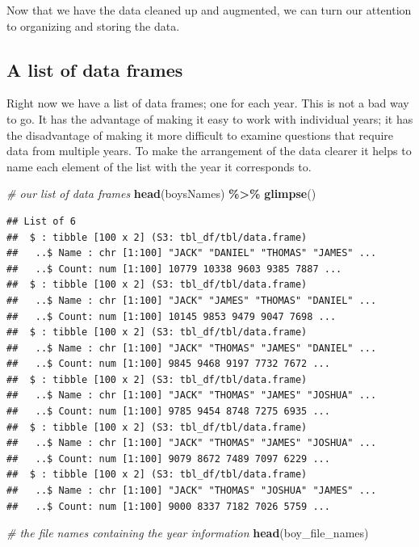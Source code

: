\documentclass[
]{book}
\newenvironment{Shaded}{\begin{snugshade}}{\end{snugshade}}
\newcommand{\CommentTok}[1]{\textcolor[rgb]{0.56,0.35,0.01}{\textit{#1}}}
\newcommand{\KeywordTok}[1]{\textcolor[rgb]{0.13,0.29,0.53}{\textbf{#1}}}
\newcommand{\NormalTok}[1]{#1}
\newcommand{\OperatorTok}[1]{\textcolor[rgb]{0.81,0.36,0.00}{\textbf{#1}}}
\newcommand{\StringTok}[1]{\textcolor[rgb]{0.31,0.60,0.02}{#1}}
\begin{document}
Now that we have the data cleaned up and augmented, we can turn our attention to organizing and storing the data.

\hypertarget{a-list-of-data-frames}{%
\subsection{A list of data frames}\label{a-list-of-data-frames}}

Right now we have a list of data frames; one for each year. This is not a bad way to go. It has the advantage of making it easy to work with individual years; it has the disadvantage of making it more difficult to examine questions that require data from multiple years. To make the arrangement of the data clearer it helps to name each element of the list with the year it corresponds to.

\begin{Shaded}
\begin{Highlighting}[]
\CommentTok{\# our list of data frames}
\KeywordTok{head}\NormalTok{(boysNames) }\OperatorTok{\%\textgreater{}\%}\StringTok{ }\KeywordTok{glimpse}\NormalTok{()}
\end{Highlighting}
\end{Shaded}

\begin{verbatim}
## List of 6
##  $ : tibble [100 x 2] (S3: tbl_df/tbl/data.frame)
##   ..$ Name : chr [1:100] "JACK" "DANIEL" "THOMAS" "JAMES" ...
##   ..$ Count: num [1:100] 10779 10338 9603 9385 7887 ...
##  $ : tibble [100 x 2] (S3: tbl_df/tbl/data.frame)
##   ..$ Name : chr [1:100] "JACK" "JAMES" "THOMAS" "DANIEL" ...
##   ..$ Count: num [1:100] 10145 9853 9479 9047 7698 ...
##  $ : tibble [100 x 2] (S3: tbl_df/tbl/data.frame)
##   ..$ Name : chr [1:100] "JACK" "THOMAS" "JAMES" "DANIEL" ...
##   ..$ Count: num [1:100] 9845 9468 9197 7732 7672 ...
##  $ : tibble [100 x 2] (S3: tbl_df/tbl/data.frame)
##   ..$ Name : chr [1:100] "JACK" "THOMAS" "JAMES" "JOSHUA" ...
##   ..$ Count: num [1:100] 9785 9454 8748 7275 6935 ...
##  $ : tibble [100 x 2] (S3: tbl_df/tbl/data.frame)
##   ..$ Name : chr [1:100] "JACK" "THOMAS" "JAMES" "JOSHUA" ...
##   ..$ Count: num [1:100] 9079 8672 7489 7097 6229 ...
##  $ : tibble [100 x 2] (S3: tbl_df/tbl/data.frame)
##   ..$ Name : chr [1:100] "JACK" "THOMAS" "JOSHUA" "JAMES" ...
##   ..$ Count: num [1:100] 9000 8337 7182 7026 5759 ...
\end{verbatim}

\begin{Shaded}
\begin{Highlighting}[]
\CommentTok{\# the file names containing the \textquotesingle{}year\textquotesingle{} information}
\KeywordTok{head}\NormalTok{(boy\_file\_names)}
\end{Highlighting}
\end{Shaded}
\end{document}
